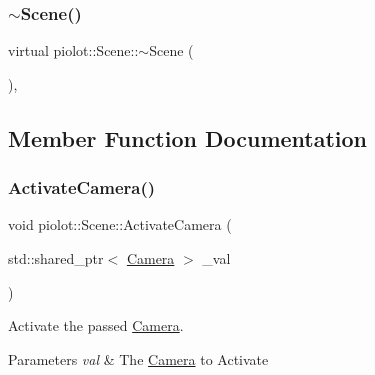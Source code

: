 \mbox{\label{classpiolot_1_1_scene_aab1c2430f0f2317c0ae5b8fa8edc6fff}} 
\subsubsection{\texorpdfstring{$\sim$\+Scene()}{~Scene()}}
{\footnotesize\ttfamily virtual piolot\+::\+Scene\+::$\sim$\+Scene (\begin{DoxyParamCaption}{ }\end{DoxyParamCaption})\hspace{0.3cm}{\ttfamily [virtual]}, {\ttfamily [default]}}



\subsection{Member Function Documentation}
\mbox{\label{classpiolot_1_1_scene_a56d2c68922b38f97554ae4edde21f718}} 
\subsubsection{\texorpdfstring{Activate\+Camera()}{ActivateCamera()}}
{\footnotesize\ttfamily void piolot\+::\+Scene\+::\+Activate\+Camera (\begin{DoxyParamCaption}\item[{std\+::shared\+\_\+ptr$<$ \mbox{\hyperlink{classpiolot_1_1_camera}{Camera}} $>$}]{\+\_\+val }\end{DoxyParamCaption})\hspace{0.3cm}{\ttfamily [inline]}}



Activate the passed \mbox{\hyperlink{classpiolot_1_1_camera}{Camera}}. 


\begin{DoxyParams}{Parameters}
{\em val} & The \mbox{\hyperlink{classpiolot_1_1_camera}{Camera}} to Activate \\
\hline
\end{DoxyParams}
\mbox{\label{classpiolot_1_1_scene_ac0d71d1ad7c27872086d9f82ee7be7fb}} 
